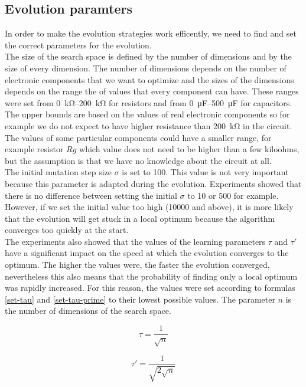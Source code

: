 \subsection{Evolution paramters}
In order to make the evolution strategies work efficently, we need to find and set the correct parameters for the evolution.\\
The size of the search space is defined by the number of dimensions and by the size of every dimension. The number of dimensions depends on the number of electronic components that we want to optimize and the sizes of the dimensions depends on the range the of values that every component can have. These ranges were set from \SIrange{0}{200}{\kilo\ohm} for resistors and from \SIrange{0}{500}{\micro\farad} for capacitors. The upper bounds are based on the values of real electronic components so for example we do not expect to have higher resistance than \SI{200}{\kilo\ohm} in the circuit. The values of some particular components could have a smaller range, for example resistor $Rg$ which value does not need to be higher than a few kiloohms, but the assumption is that we have no knowledge about the circuit at all.\\
The initial mutation step size $\sigma$ is set to 100. This value is not very important because this parameter is adapted during the evolution. Experiments showed that there is no difference between setting the initial $\sigma$ to 10 or 500 for example. However, if we set the initial value too high (10000 and above), it is more likely that the evolution will get stuck in a local optimum because the algorithm converges too quickly at the start.\\
The experiments also showed that the values of the learning parameters $\tau$ and $\tau'$ have a significant impact on the speed at which the evolution converges to the optimum. The higher the values were, the faster the evolution converged, nevertheless this also means that the probability of finding only a local optimum was rapidly increased. For this reason, the values were set according to formulas \ref{set-tau} and \ref{set-tau-prime} to their lowest possible values. The parameter $n$ is the number of dimensions of the search space.

\begin{equation} \label{set-tau}
    \tau = \frac{1}{\sqrt{n}}
\end{equation}

\begin{equation} \label{set-tau-prime}
    \tau' = \frac{1}{\sqrt{2\sqrt{n}}}
\end{equation}

